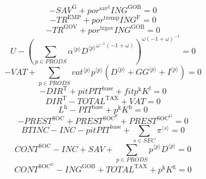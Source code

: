 \begin{equation}
-{S\!A\!V}^{\mathrm{G}} + {{p\!o\!r}^{\mathrm{sav}^{\mathrm{g}}}} {{I\!N\!G}^{\mathrm{GOB}}} = 0
\end{equation}
\begin{equation}
-{T\!R}^{\mathrm{EMP}} + {{p\!o\!r}^{\mathrm{tremp}}} {{I\!N\!G}^{\mathrm{F}}} = 0
\end{equation}
\begin{equation}
-{T\!R}^{\mathrm{GOV}} + {{p\!o\!r}^{\mathrm{trgov}}} {{I\!N\!G}^{\mathrm{GOB}}} = 0
\end{equation}
\begin{equation}
U - \left(\sum_{p\in {P\!R\!O\!D\!S}} {{\alpha}^{\langle p\rangle}} {{{D}^{\langle p\rangle}}^{{\omega}^{-1} \left(-1 + \omega\right)}}\right)^{{\omega} \left(-1 + \omega\right)^{-1}} = 0
\end{equation}
\begin{equation}
-{V\!A\!T} + \sum_{p\in {P\!R\!O\!D\!S}} {{{v\!a\!t}}^{\langle p\rangle}} {{p}^{\langle p\rangle}} \left({D}^{\langle p\rangle} + {{G\!G}}^{\langle p\rangle} + {I}^{\langle p\rangle}\right) = 0
\end{equation}
\begin{equation}
-{D\!I\!R}^{\mathrm{T}} + {{p\!i\!t}} {{P\!I\!T}^{\mathrm{base}}} + {{f\!i\!t}} {p^{\mathrm{k}}} {K^{\mathrm{f}}} = 0
\end{equation}
\begin{equation}
{D\!I\!R}^{\mathrm{T}} - {T\!O\!T\!A\!L}^{\mathrm{TAX}} + {V\!A\!T} = 0
\end{equation}
\begin{equation}
L^{\mathrm{h}} - {P\!I\!T}^{\mathrm{base}} + {p^{\mathrm{k}}} {K^{\mathrm{h}}} = 0
\end{equation}
\begin{equation}
-{P\!R\!E\!S\!T}^{\mathrm{SOC}} + {P\!R\!E\!S\!T}^{\mathrm{SOC}^{\mathrm{F}}} + {P\!R\!E\!S\!T}^{\mathrm{SOC}^{\mathrm{G}}} = 0
\end{equation}
\begin{equation}
{B\!T\!I\!N\!C} - {I\!N\!C} - {{p\!i\!t}} {{P\!I\!T}^{\mathrm{base}}} + \sum_{s\in {S\!E\!C}} {\pi}^{\langle s\rangle} = 0
\end{equation}
\begin{equation}
{C\!O\!N\!T}^{\mathrm{SOC}} - {I\!N\!C} + {S\!A\!V} + \sum_{p\in {P\!R\!O\!D\!S}} {{p}^{\langle p\rangle}} {{D}^{\langle p\rangle}} = 0
\end{equation}
\begin{equation}
{C\!O\!N\!T}^{\mathrm{SOC}^{\mathrm{G}}} - {I\!N\!G}^{\mathrm{GOB}} + {T\!O\!T\!A\!L}^{\mathrm{TAX}} + {p^{\mathrm{k}}} {K^{\mathrm{g}}} = 0
\end{equation}
